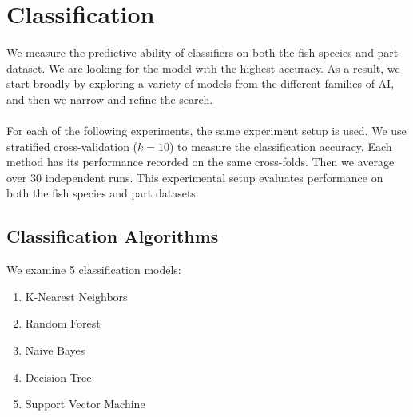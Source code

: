 \documentclass[runningheads]{llncs}
\begin{document}
\section{Classification}

We measure the predictive ability of classifiers on both the fish species and part dataset.
We are looking for the model with the highest accuracy.
As a result, we start broadly by exploring a variety of models from the different families of AI, and then we narrow and refine the search.
\\\\
For each of the following experiments, the same experiment setup is used.
We use stratified cross-validation ($k=10$) to measure the classification accuracy.
Each method has its performance recorded on the same cross-folds.
Then we average over 30 independent runs.
This experimental setup evaluates performance on both the fish species and part datasets.

\subsection{Classification Algorithms}




We examine 5 classification models:

\begin{enumerate}
  \item K-Nearest Neighbors \cite{fix1989discriminatory}
  \item Random Forest \cite{ho1995random}
  \item Naive Bayes \cite{hand2001idiot}
  \item Decision Tree \cite{loh2011classification}
  \item Support Vector Machine \cite{cortes1995support}
\end{enumerate}
\end{document}
